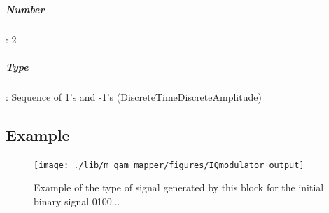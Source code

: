 \subparagraph*{Number}: 2

\subparagraph*{Type}: Sequence of 1's and -1's (DiscreteTimeDiscreteAmplitude)

\subsection*{Example}

\begin{figure}
	\centering
	\texttt{[image: ./lib/m\_qam\_mapper/figures/IQmodulator\_output]}
	
	\caption{Example of the type of signal generated by this block for the initial binary signal 0100... }\label{DeterministicAppendZeros}

\end{figure}

